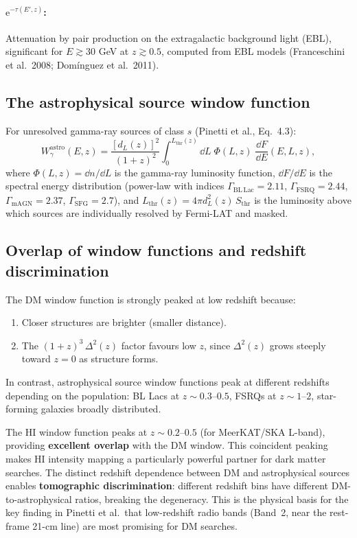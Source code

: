 \documentclass[10pt,a4paper]{article}
\newcommand{\ee}{\mathrm{e}}
\begin{document}
\paragraph{$\ee^{-\tau(E', z)}$:} Attenuation by pair production on the extragalactic background light (EBL), significant for $E \gtrsim 30$ GeV at $z \gtrsim 0.5$, computed from EBL models (Franceschini et al.\ 2008; Dom\'{i}nguez et al.\ 2011).

\subsection{The astrophysical source window function}

For unresolved gamma-ray sources of class $s$ (Pinetti et al., Eq.~4.3):
\begin{equation}
\label{eq:W_astro}
W_\gamma^{\mathrm{astro}}(E, z) = \frac{[d_L(z)]^2}{(1 + z)^2} \int_0^{L_{\mathrm{thr}}(z)} \dd L \; \Phi(L, z) \; \frac{\dd F}{\dd E}(E, L, z),
\end{equation}
where $\Phi(L, z) = \dd n/\dd L$ is the gamma-ray luminosity function, $\dd F/\dd E$ is the spectral energy distribution (power-law with indices $\Gamma_{\mathrm{BL\,Lac}} = 2.11$, $\Gamma_{\mathrm{FSRQ}} = 2.44$, $\Gamma_{\mathrm{mAGN}} = 2.37$, $\Gamma_{\mathrm{SFG}} = 2.7$), and $L_{\mathrm{thr}}(z) = 4\pi d_L^2(z) \, S_{\mathrm{thr}}$ is the luminosity above which sources are individually resolved by Fermi-LAT and masked.

\subsection{Overlap of window functions and redshift discrimination}

The DM window function is strongly peaked at low redshift because:
\begin{enumerate}[nosep]
    \item Closer structures are brighter (smaller distance).
    \item The $(1 + z)^3 \, \Delta^2(z)$ factor favours low $z$, since $\Delta^2(z)$ grows steeply toward $z = 0$ as structure forms.
\end{enumerate}
In contrast, astrophysical source window functions peak at different redshifts depending on the population: BL Lacs at $z \sim 0.3$--$0.5$, FSRQs at $z \sim 1$--$2$, star-forming galaxies broadly distributed.

The HI window function peaks at $z \sim 0.2$--$0.5$ (for MeerKAT/SKA L-band), providing \textbf{excellent overlap} with the DM window. This coincident peaking makes HI intensity mapping a particularly powerful partner for dark matter searches. The distinct redshift dependence between DM and astrophysical sources enables \textbf{tomographic discrimination}: different redshift bins have different DM-to-astrophysical ratios, breaking the degeneracy. This is the physical basis for the key finding in Pinetti et al.\ that low-redshift radio bands (Band~2, near the rest-frame 21-cm line) are most promising for DM searches.
\end{document}
